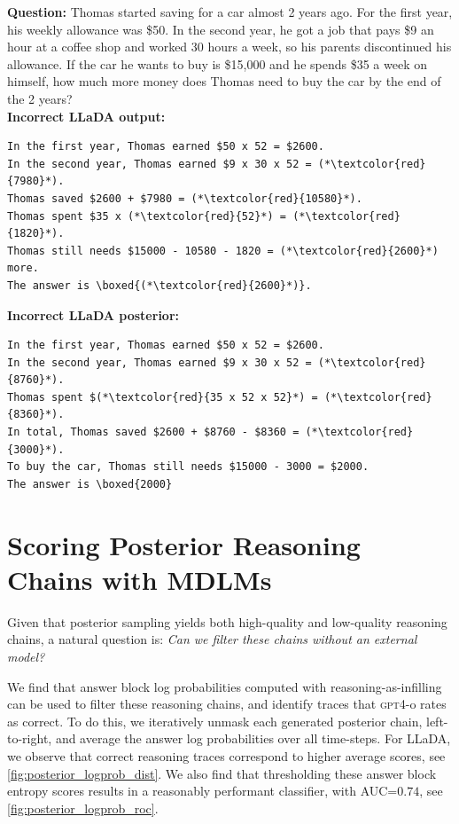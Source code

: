 \begin{examplebox}[Example 2]
\textbf{Question:} Thomas started saving for a car almost 2 years ago. For the first year, his weekly allowance was \$50. In the second year, he got a job that pays \$9 an hour at a coffee shop and worked 30 hours a week, so his parents discontinued his allowance. If the car he wants to buy is \$15{,}000 and he spends \$35 a week on himself, how much more money does Thomas need to buy the car by the end of the 2 years? \\[6pt]

\textbf{Incorrect LLaDA output:}
\begin{lstlisting}
In the first year, Thomas earned $50 x 52 = $2600.
In the second year, Thomas earned $9 x 30 x 52 = (*\textcolor{red}{7980}*).
Thomas saved $2600 + $7980 = (*\textcolor{red}{10580}*).
Thomas spent $35 x (*\textcolor{red}{52}*) = (*\textcolor{red}{1820}*).
Thomas still needs $15000 - 10580 - 1820 = (*\textcolor{red}{2600}*) more.
The answer is \boxed{(*\textcolor{red}{2600}*)}.
\end{lstlisting}

\textbf{Incorrect LLaDA posterior:}
\begin{lstlisting}
In the first year, Thomas earned $50 x 52 = $2600.
In the second year, Thomas earned $9 x 30 x 52 = (*\textcolor{red}{8760}*).
Thomas spent $(*\textcolor{red}{35 x 52 x 52}*) = (*\textcolor{red}{8360}*).
In total, Thomas saved $2600 + $8760 - $8360 = (*\textcolor{red}{3000}*).
To buy the car, Thomas still needs $15000 - 3000 = $2000.
The answer is \boxed{2000}
\end{lstlisting}
\end{examplebox}

\section{Scoring Posterior Reasoning Chains with MDLMs}\label{appsec:posterior_filtering}

Given that posterior sampling yields both high-quality and low-quality reasoning chains, a natural question is: \textit{Can we filter these chains without an external model?}

We find that answer block log probabilities computed with reasoning-as-infilling can be used to filter these reasoning chains, and identify traces that \textsc{gpt4}-o rates as correct. To do this, we iteratively unmask each generated posterior chain, left-to-right, and average the answer log probabilities over all time-steps. For LLaDA, we observe that correct reasoning traces correspond to higher average scores, see \cref{fig:posterior_logprob_dist}. We also find that thresholding these answer block entropy scores results in a reasonably performant classifier, with AUC=$0.74$, see \cref{fig:posterior_logprob_roc}.

